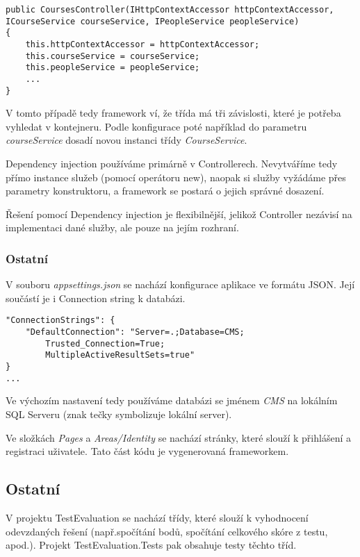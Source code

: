 \begin{lstlisting}
public CoursesController(IHttpContextAccessor httpContextAccessor, ICourseService courseService, IPeopleService peopleService)
{
	this.httpContextAccessor = httpContextAccessor;
	this.courseService = courseService;
	this.peopleService = peopleService;
	...
}
\end{lstlisting}
V tomto případě tedy framework ví, že třída má tři závislosti, které je potřeba vyhledat v kontejneru.
Podle konfigurace poté například do parametru \textit{courseService} dosadí novou instanci třídy \textit{CourseService}. 

Dependency injection používáme primárně v Controllerech.
Nevytváříme tedy přímo instance služeb (pomocí operátoru new), naopak si služby vyžádáme přes parametry konstruktoru, a framework se postará o jejich správné dosazení.

Řešení pomocí Dependency injection je flexibilnější, jelikož Controller nezávisí na implementaci dané služby, ale pouze na jejím rozhraní.

\subsubsection*{Ostatní}

V souboru \textit{appsettings.json} se nachází konfigurace aplikace ve formátu JSON. Její součástí je i Connection string k databázi. 
\begin{lstlisting}
"ConnectionStrings": {
	"DefaultConnection": "Server=.;Database=CMS;
		Trusted_Connection=True;
		MultipleActiveResultSets=true" 
}
...
\end{lstlisting}

Ve výchozím nastavení tedy používáme databázi se jménem \textit{CMS} na lokálním SQL Serveru (znak tečky symbolizuje lokální server).

Ve složkách \textit{Pages} a \textit{Areas/Identity} se nachází stránky, které slouží k přihlášení a registraci uživatele. Tato část kódu je vygenerovaná frameworkem.


\subsection{Ostatní}

V projektu TestEvaluation se nachází třídy, které slouží k vyhodnocení odevzdaných řešení (např.spočítání bodů, spočítání celkového skóre z testu, apod.). Projekt TestEvaluation.Tests pak obsahuje testy těchto tříd.


